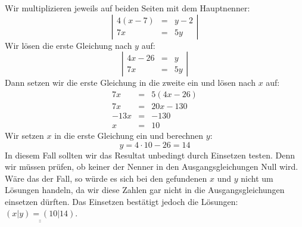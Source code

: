 \documentclass[%
11pt,%
twoside,%
titlepage,%
german,%
]{scrartcl}
\newcommand{\result}[1]{\underline{\underline{#1}}}
\begin{document}
\begin{enumerate}
\begin{enumerate}
    Wir multiplizieren jeweils auf beiden Seiten mit dem Hauptnenner:
    \begin{displaymath}
      \left| 
        \begin{array}{rcl}
         4(x-7) & = & y-2 \\
          7x & = & 5y
        \end{array} \right|
    \end{displaymath}
    Wir l\"osen die erste Gleichung nach $y$ auf:
    \begin{displaymath}
      \left| 
        \begin{array}{rcl}
         4x-26 & = & y \\
          7x & = & 5y
        \end{array} \right|
    \end{displaymath}
    Dann setzen wir die erste Gleichung in die zweite ein und l\"osen nach $x$ auf:
    \begin{eqnarray*}
      7x & = & 5(4x-26) \\
      7x & = & 20x-130 \\
      -13x & = & -130 \\
      x & = & 10
    \end{eqnarray*}
    Wir setzen $x$ in die erste Gleichung ein und berechnen $y$:
    \begin{displaymath}
      y = 4\cdot 10-26 = 14
    \end{displaymath}
    In diesem Fall sollten wir das Resultat unbedingt durch Einsetzen testen. Denn wir m\"ussen pr\"ufen, ob keiner der Nenner in den Ausgangsgleichungen Null wird. W\"are das der Fall, so w\"urde es sich bei den gefundenen $x$ und $y$ nicht um L\"osungen handeln, da wir diese Zahlen gar nicht in die Ausgangsgleichungen einsetzen d\"urften. Das Einsetzen best\"atigt jedoch die L\"osungen: $\result{(x|y)=(10|14)}$.


\end{enumerate}
\end{enumerate}
\end{document}

